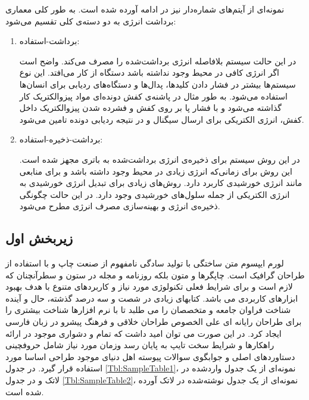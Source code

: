 نمونه‌ای از آیتم‌های شماره‌دار نیز در ادامه آورده شده است. به طور کلی معماری برداشت انرژی به دو دسته‌ی کلی تقسیم می‌شود:
\begin{enumerate}[label=\arabic*)]
\item
برداشت-استفاده:

در این حالت سیستم بلافاصله انرژی برداشت‌شده را مصرف می‌کند. واضح است اگر انرژی کافی در محیط وجود نداشته باشد دستگاه از کار می‌افتد. این نوع سیستم‌ها بیشتر در فشار دادن کلید‌ها، پدال‌ها و دستگاه‌های ردیابی برای انسان‌ها استفاده می‌شود. به طور مثال در پاشنه‌ی کفش دونده‌ای مواد پیزوالکتریک کار گذاشته می‌شود و با فشار پا بر روی کفش و فشرده شدن پیزوالکتریک داخل کفش، انرژی الکتریکی برای ارسال سیگنال 
و در نتیجه ردیابی دونده تامین می‌شود. 
\item
برداشت-ذخیره-استفاده:

در این روش سیستم برای ذخیره‌ی انرژی برداشت‌شده به باتری مجهز شده است. این روش برای زمانی‌که انرژی زیادی در محیط وجود داشته باشد و برای منابعی مانند انرژی خورشیدی  کاربرد دارد. روش‌های زیادی برای تبدیل انرژی خورشیدی به انرژی الکتریکی از جمله سلول‌های خورشیدی وجود دارد. در این حالت چگونگی ذخیره‌ی انرژی و بهینه‌سازی مصرف انرژی مطرح می‌شود.
\end{enumerate}




\subsection{زیربخش اول}
لورم ایپسوم متن ساختگی با تولید سادگی نامفهوم از صنعت چاپ و با استفاده از طراحان گرافیک است. چاپگرها و متون بلکه روزنامه و مجله در ستون و سطرآنچنان که لازم است و برای شرایط فعلی تکنولوژی مورد نیاز و کاربردهای متنوع با هدف بهبود ابزارهای کاربردی می باشد. کتابهای زیادی در شصت و سه درصد گذشته، حال و آینده شناخت فراوان جامعه و متخصصان را می طلبد تا با نرم افزارها شناخت بیشتری را برای طراحان رایانه ای علی الخصوص طراحان خلاقی و فرهنگ پیشرو در زبان فارسی ایجاد کرد. در این صورت می توان امید داشت که تمام و دشواری موجود در ارائه راهکارها و شرایط سخت تایپ به پایان رسد وزمان مورد نیاز شامل حروفچینی دستاوردهای اصلی و جوابگوی سوالات پیوسته اهل دنیای موجود طراحی اساسا مورد استفاده قرار گیرد. در جدول
\ref{Tbl:SampleTable1}،
نمونه‌ای از یک جدول واردشده در لاتک و در جدول
\ref{Tbl:SampleTable2}،
نمونه‌ای از یک جدول نوشته‌شده در لاتک آورده شده است.

